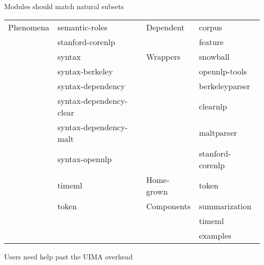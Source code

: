 \documentclass[final]{beamer}
\begin{document}
\begin{frame}[fragile]
\begin{columns}[t]
\begin{column}{.45\linewidth}
\begin{block}{Modules should match natural subsets}
\begin{center}
\begin{tabular*}{.90\linewidth}{ll|ll}
                    Phenomena            & semantic-roles & Dependent  & corpus \\
                                         & stanford-corenlp &                    & feature\\
                                        \cline{3-4}
                                         & syntax           & Wrappers & snowball \\
                                         & syntax-berkeley  &                    & opennlp-tools \\
                                         & syntax-dependency &                   & berkeleyparser\\
                                         & syntax-dependency-clear &             & clearnlp\\
                                         & syntax-dependency-malt &              & maltparser\\
                                         & syntax-opennlp &                      & stanford-corenlp\\
                                        \cline{3-4}
                                         & timeml         & Home-grown & token \\
                                         & token          & Components            & summarization\\
                                         &                        &                       & timeml \\
                                         &                        &                       & examples \\
                    \cline{1-4}
                    \end{tabular*}
            \end{center}


    \end{block}

    \begin{block}{Users need help past the UIMA overhead}


\end{block}
\end{column}
\end{columns}
\end{frame}
\end{document}
